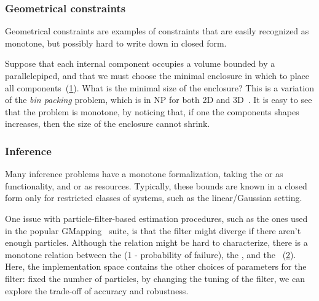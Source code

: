 \subsubsection{Geometrical constraints}

Geometrical constraints are examples of constraints that are easily recognized as monotone, but possibly hard to write down in closed form.

\begin{example}
    Suppose that each internal component occupies a volume bounded by a parallelepiped, and that we must choose the minimal enclosure in which to place all components~(\cref{fig:packing}).
    What is the minimal size of the enclosure?
    This is a variation of the \emph{bin packing} problem, which is in NP for both 2D and 3D~\cite{lodi02two}.
    It is easy to see that the problem is monotone, by noticing that, if one the components shapes increases, then the size of the enclosure cannot shrink.

\end{example}
\begin{figure}[tbh]
    \centering
    \caption{}
    \label{fig:packing}
\end{figure}

\subsubsection{Inference}

Many inference problems have a monotone formalization, taking the
 or  as functionality, and 
or  as resources.
Typically, these bounds are known in a closed form only for restricted classes of systems, such as the linear/Gaussian setting.

\begin{example}[SLAM]
    One issue with particle-filter-based estimation procedures, such as the ones used in the popular GMapping~\cite{grisetti07improved} suite, is that the filter might diverge if there aren't enough particles.
    Although the relation might be hard to characterize, there is a monotone relation between the  (1 - probability of failure), the , and the ~(\cref{fig:gmapping}).
    Here, the implementation space contains the other choices of parameters for the filter: fixed the number of particles, by changing the tuning of the filter, we can explore the trade-off of accuracy and robustness.
\end{example}
\begin{figure}[h!]
    \centering
    \caption{}
    \label{fig:gmapping}
\end{figure}

